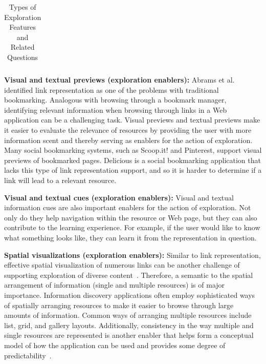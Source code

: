 \documentclass[review]{elsarticle}
\newcommand{\feature}[1]{{\ttfamily#1}}
\begin{document}
{{\begin{table}[!htbp]
\begin{tabular}{|p{0.25\linewidth}| p{0.35\linewidth}| p{0.35\linewidth}|}
\hline
\end{tabular}
\caption{Types of Exploration Features and Related Questions}
\label{table:framework_exploration} 
\end{table}

\textbf{Visual and textual previews (exploration enablers):} Abrams et al.~\cite{abrams1998information} identified link representation as one of the problems with traditional bookmarking. Analogous with browsing through a bookmark manager, identifying relevant information when browsing through links in a Web application can be a challenging task. \feature{Visual previews} and \feature{textual previews} make it easier to evaluate the relevance of resources by providing the user with more information scent and thereby serving as enablers for the action of exploration. Many social bookmarking systems, such as Scoop.it! and Pinterest, support visual previews of bookmarked pages. Delicious is a social bookmarking application that lacks this type of link representation support, and so it is harder to determine if a link will lead to a relevant resource.

\textbf{Visual and textual cues (exploration enablers):} \feature{Visual and textual information cues} are also important enablers for the action of exploration. Not only do they help navigation within the resource or Web page, but they can also contribute to the learning experience. For example, if the user would like to know what something looks like, they can learn it from the representation in question.  

\textbf{Spatial visualizations (exploration enablers):} Similar to link representation, effective spatial visualization of numerous links can be another challenge of supporting exploration of diverse content~\cite{abrams1998information}. Therefore, a semantic to the \feature{spatial arrangement} of information (single and multiple resources) is of major importance. Information discovery applications often employ sophisticated ways of spatially arranging resources to make it easier to browse through large amounts of information. Common ways of arranging multiple resources include \feature{list}, \feature{grid}, and \feature{gallery} layouts. Additionally, \feature{consistency} in the way multiple and single resources are represented is another enabler that helps form a conceptual model of how the application can be used and provides some degree of predictability~\cite{norman2002design}.
} %

}
\end{document}
